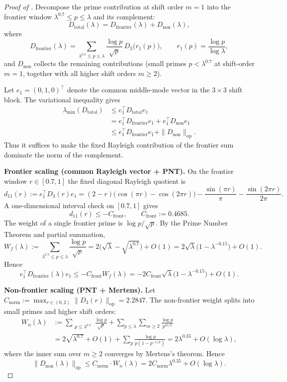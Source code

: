 \documentclass[12pt,a4paper]{article}
\theoremstyle{definition}
\theoremstyle{remark}
\begin{document}
\begin{proof}[Proof of ]
Decompose the prime contribution at shift order $m=1$ into the frontier window $\lambda^{0.7} \leq p \leq \lambda$ and its complement:
\[
D_{\mathrm{total}}(\lambda) = D_{\mathrm{frontier}}(\lambda) + D_{\mathrm{non}}(\lambda),
\]
where
\[
D_{\mathrm{frontier}}(\lambda) = \sum_{\lambda^{0.7} \leq p \leq \lambda} \frac{\log p}{\sqrt{p}}\,D_3\bigl(r_1(p)\bigr), \qquad r_1(p) = \frac{\log p}{\log \lambda},
\]
and $D_{\mathrm{non}}$ collects the remaining contributions (small primes $p < \lambda^{0.7}$ at shift-order $m=1$, together with all higher shift orders $m \geq 2$).

Let $e_1=(0,1,0)^\top$ denote the common middle-mode vector in the $3\times3$ shift block. The variational inequality gives
\begin{align}
\lambda_{\min}(D_{\mathrm{total}}) &\leq e_1^\top D_{\mathrm{total}} e_1 \nonumber \\
 &= e_1^\top D_{\mathrm{frontier}} e_1 + e_1^\top D_{\mathrm{non}} e_1 \nonumber \\
 &\leq e_1^\top D_{\mathrm{frontier}} e_1 + \|D_{\mathrm{non}}\|_{\mathrm{op}}.
 \label{eq:direct-bound}
\end{align}
Thus it suffices to make the fixed Rayleigh contribution of the frontier sum dominate the norm of the complement.

\smallskip
\noindent\textbf{Frontier scaling (common Rayleigh vector + PNT).} On the frontier window $r \in [0.7,1]$ the fixed diagonal Rayleigh quotient is
\[
d_{11}(r) := e_1^\top D_3(r)e_1
 = (2-r)\bigl(\cos(\pi r)-\cos(2\pi r)\bigr)
   - \frac{\sin(\pi r)}{\pi}
   - \frac{\sin(2\pi r)}{2\pi}.
\]
A one-dimensional interval check on $[0.7,1]$ gives
\[
d_{11}(r) \leq -C_{\mathrm{front}}, \qquad C_{\mathrm{front}}:=0.4685.
\]
The weight of a single frontier prime is $\log p / \sqrt{p}$. By the Prime Number Theorem and partial summation,
\[
W_f(\lambda) := \sum_{\lambda^{0.7} \leq p \leq \lambda} \frac{\log p}{\sqrt{p}} = 2\bigl(\sqrt{\lambda} - \sqrt{\lambda^{0.7}}\bigr) + O(1) = 2\sqrt{\lambda}\bigl(1 - \lambda^{-0.15}\bigr) + O(1).
\]
Hence
\[
e_1^\top D_{\mathrm{frontier}}(\lambda)e_1 \leq -C_{\mathrm{front}} W_f(\lambda)
= -2 C_{\mathrm{front}}\sqrt{\lambda}\bigl(1-\lambda^{-0.15}\bigr)+O(1).
\]

\smallskip
\noindent\textbf{Non-frontier scaling (PNT + Mertens).} Let $C_{\mathrm{norm}} := \max_{r \in (0, 2)} \|D_3(r)\|_{\mathrm{op}} = 2.2847$. The non-frontier weight splits into small primes and higher shift orders:
\begin{align*}
W_n(\lambda) &:= \sum_{\substack{p \leq \lambda^{0.7}}} \frac{\log p}{\sqrt{p}} + \sum_{p \leq \lambda} \sum_{m \geq 2} \frac{\log p}{p^{m/2}} \\
 &= 2\sqrt{\lambda^{0.7}} + O(1) + \sum_p \frac{\log p}{p(1 - p^{-1/2})} = 2 \lambda^{0.35} + O(\log \lambda),
\end{align*}
where the inner sum over $m \geq 2$ converges by Mertens's theorem. Hence
\[
\|D_{\mathrm{non}}(\lambda)\|_{\mathrm{op}} \leq C_{\mathrm{norm}} \cdot W_n(\lambda) = 2 C_{\mathrm{norm}} \lambda^{0.35} + O(\log \lambda).
\]


\end{proof}
\end{document}

